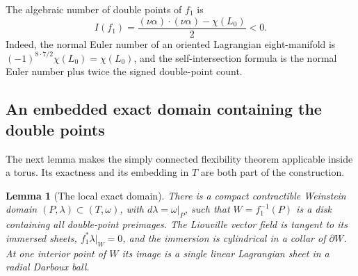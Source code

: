\documentclass[11pt]{article}
\newtheorem{lemma}[theorem]{Lemma}
\theoremstyle{definition}
\theoremstyle{remark}
\numberwithin{equation}{section}
\begin{document}
The algebraic number of double points of $f_1$ is
\begin{equation}\label{top:negative-index}
 I(f_1)=\frac{(\nu\alpha)\cdot(\nu\alpha)-\chi(L_0)}2<0.
\end{equation}
Indeed, the normal Euler number of an oriented Lagrangian
eight-manifold is $(-1)^{8\cdot7/2}\chi(L_0)=\chi(L_0)$, and
the self-intersection formula is the normal Euler number plus twice
the signed double-point count.

\subsection{An embedded exact domain containing the double points}

The next lemma makes the simply connected flexibility theorem
applicable inside a torus.  Its exactness and its embedding in $T$
are both part of the construction.

\begin{lemma}[The local exact domain]\label{top:exact-domain}
There is a compact contractible Weinstein domain
$(P,\lambda)\subset(T,\omega)$, with $d\lambda=\omega|_P$, such
that $W=f_1^{-1}(P)$ is a disk containing all double-point
preimages.  The Liouville vector field is tangent to its immersed
sheets, $f_1^*\lambda|_W=0$, and the immersion is cylindrical in
a collar of $\partial W$.  At one interior point of $W$ its image
is a single linear Lagrangian sheet in a radial Darboux ball.
\end{lemma}
\end{document}
